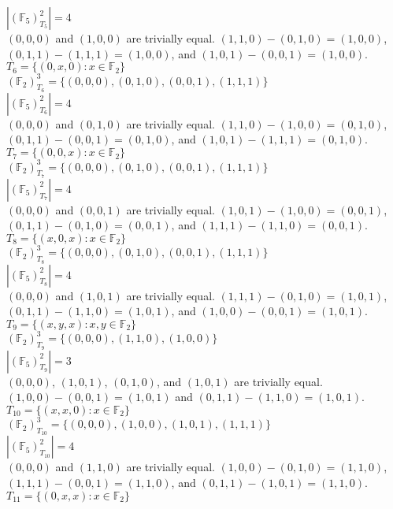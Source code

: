 \documentclass[11pt]{article}
\begin{document}
\begin{flushleft}
$|(\mathbb{F}_5)^2_{T_5}| = 4$ \\
$(0,0,0)$ and $(1,0,0)$ are trivially equal. $(1,1,0) - (0,1,0) = (1, 0, 0)$, $(0,1,1) - (1,1,1) = (1,0,0)$, and $(1,0,1)-(0,0,1) = (1,0,0)$. \\
\bigskip
$T_6 = \{ (0,x,0): x \in \mathbb{F}_2 \}$ \\
$(\mathbb{F}_2)^3_{T_6} = \{ (0,0,0), (0,1,0), (0,0,1), (1,1,1) \}$ \\
$|(\mathbb{F}_5)^2_{T_6}| = 4$ \\
$(0,0,0)$ and $(0,1,0)$ are trivially equal. $(1,1,0) - (1,0,0) = (0, 1, 0)$, $(0,1,1) - (0,0,1) = (0,1,0)$, and $(1,0,1)-(1,1,1) = (0,1,0)$. \\
\bigskip
$T_7 = \{ (0,0,x): x \in \mathbb{F}_2 \}$ \\
$(\mathbb{F}_2)^3_{T_7} = \{ (0,0,0), (0,1,0), (0,0,1), (1,1,1) \}$ \\
$|(\mathbb{F}_5)^2_{T_7}| = 4$ \\
$(0,0,0)$ and $(0,0,1)$ are trivially equal. $(1,0,1) - (1,0,0) = (0, 0, 1)$, $(0,1,1) - (0,1,0) = (0,0,1)$, and $(1,1,1)-(1,1,0) = (0,0,1)$. \\
\bigskip
$T_8 = \{ (x,0,x): x \in \mathbb{F}_2 \}$ \\
$(\mathbb{F}_2)^3_{T_8} = \{ (0,0,0), (0,1,0), (0,0,1), (1,1,1) \}$ \\
$|(\mathbb{F}_5)^2_{T_8}| = 4$ \\
$(0,0,0)$ and $(1,0,1)$ are trivially equal. $(1,1,1) - (0,1,0) = (1, 0, 1)$, $(0,1,1) - (1,1,0) = (1,0,1)$, and $(1,0,0)-(0,0,1) = (1,0,1)$. \\
\bigskip
$T_9 = \{ (x,y,x): x,y \in \mathbb{F}_2 \}$ \\
$(\mathbb{F}_2)^3_{T_9} = \{ (0,0,0), (1,1,0), (1,0,0) \}$ \\
$|(\mathbb{F}_5)^2_{T_9}| = 3$ \\
$(0,0,0)$, $(1,0,1)$, $(0,1,0)$, and $(1,0,1)$ are trivially equal. $(1,0,0) - (0,0,1) = (1, 0, 1)$ and $(0,1,1)-(1,1,0) = (1,0,1)$. \\
\bigskip
$T_{10} = \{ (x,x,0): x \in \mathbb{F}_2 \}$ \\
$(\mathbb{F}_2)^3_{T_{10}} = \{ (0,0,0), (1,0,0), (1,0,1), (1,1,1) \}$ \\
$|(\mathbb{F}_5)^2_{T_{10}}| = 4$ \\
$(0,0,0)$ and $(1,1,0)$ are trivially equal. $(1,0,0) - (0,1,0) = (1, 1, 0)$, $(1,1,1)-(0,0,1) = (1,1,0)$, and $(0,1,1)-(1,0,1) = (1,1,0)$. \\
\bigskip
$T_{11} = \{ (0,x,x): x \in \mathbb{F}_2 \}$ \\

\end{flushleft}
\end{document}
